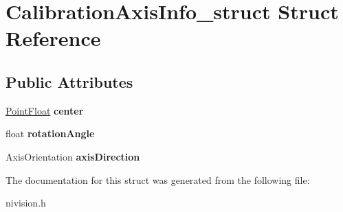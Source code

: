\hypertarget{structCalibrationAxisInfo__struct}{
\section{CalibrationAxisInfo\_\-struct Struct Reference}
\label{structCalibrationAxisInfo__struct}
}
\subsection*{Public Attributes}
\begin{DoxyCompactItemize}
\item 
\hypertarget{structCalibrationAxisInfo__struct_af184f735703dc390d753193ee128b8c1}{
\hyperlink{structPointFloat__struct}{PointFloat} {\bfseries center}}
\label{structCalibrationAxisInfo__struct_af184f735703dc390d753193ee128b8c1}

\item 
\hypertarget{structCalibrationAxisInfo__struct_aef8aaab9576788e64eddb44d638d08b8}{
float {\bfseries rotationAngle}}
\label{structCalibrationAxisInfo__struct_aef8aaab9576788e64eddb44d638d08b8}

\item 
\hypertarget{structCalibrationAxisInfo__struct_ade1f73d5372c09c848943d8f68979c29}{
AxisOrientation {\bfseries axisDirection}}
\label{structCalibrationAxisInfo__struct_ade1f73d5372c09c848943d8f68979c29}

\end{DoxyCompactItemize}


The documentation for this struct was generated from the following file:\begin{DoxyCompactItemize}
\item 
nivision.h\end{DoxyCompactItemize}
